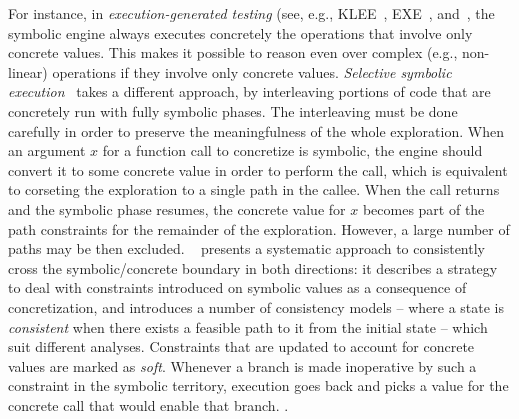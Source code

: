 \vspace{-2pt} 
 For instance, in {\em execution-generated testing} (see, e.g., {\sc KLEE}~\cite{KLEE-OSDI08}, {\sc EXE}~\cite{EXE-CCS06}, and~\cite{CS-CACM13}, the symbolic engine always executes concretely the operations that involve only concrete values. This makes it possible to reason even over complex (e.g., non-linear) operations if they involve only concrete values. {\em Selective symbolic execution}~\cite{CKC-TOCS12} takes a different approach, by interleaving portions of code that are concretely run with fully symbolic phases. The interleaving must be done carefully in order to preserve the meaningfulness of the whole exploration. When an argument $x$ for a function call to concretize is symbolic, the engine should convert it to some concrete value in order to perform the call, which is equivalent to corseting the exploration to a single path in the callee. When the call returns and the symbolic phase resumes, the concrete value for $x$ becomes part of the path constraints for the remainder of the exploration. However, a large number of paths may be then excluded. {\sc \stwoe}~\cite{CKC-TOCS12} presents a systematic approach to consistently cross the symbolic/concrete boundary in both directions: it describes a strategy to deal with constraints introduced on symbolic values as a consequence of concretization, and introduces a number of consistency models -- where a state is {\em consistent} when there exists a feasible path to it from the initial state -- which suit different analyses. Constraints that are updated to account for concrete values are marked as {\em soft}. Whenever a branch is made inoperative by such a constraint in the symbolic territory, execution goes back and picks a value for the concrete call that would enable that branch. .

